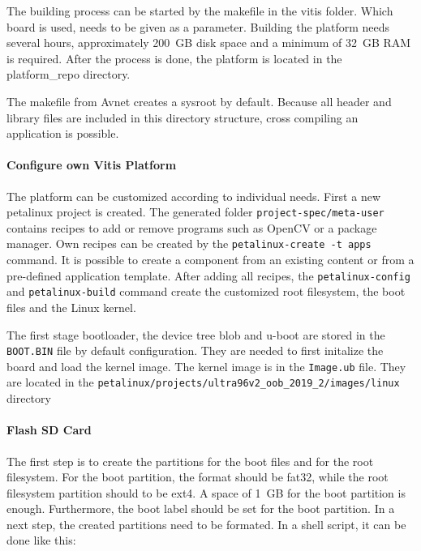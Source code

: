 The building process can be started by the makefile in the vitis folder.
Which board is used, needs to be given as a parameter.
Building the platform needs several hours, approximately \SI{200}{GB} disk space and a minimum of \SI{32}{GB} RAM is required.
After the process is done, the platform is located in the platform\_repo directory.

The makefile from Avnet creates a sysroot by default.
Because all header and library files are included in this directory structure, cross compiling an application is possible.

\paragraph{Configure own Vitis Platform}
The platform can be customized according to individual needs.
First a new petalinux project is created.
The generated folder \texttt{project-spec/meta-user} contains recipes to add or remove programs such as OpenCV or a package manager.
Own recipes can be created by the \texttt{petalinux-create -t apps} command.
It is possible to create a component from an existing content or from a pre-defined application template.
After adding all recipes, the \texttt{petalinux-config} and \texttt{petalinux-build} command create the customized root filesystem, the boot files and the Linux kernel. %

The first stage bootloader, the device tree blob and u-boot are stored in the \texttt{BOOT.BIN} file by default configuration.
They are needed to first initalize the board and load the kernel image. %
The kernel image is in the \texttt{Image.ub} file. %
They are located in the \texttt{petalinux/projects/ultra96v2\_oob\_2019\_2/images/linux} directory

\paragraph{Flash SD Card}
The first step is to create the partitions for the boot files and for the root filesystem.
For the boot partition, the format should be fat32, while the root filesystem partition should to be ext4.
A space of \SI{1}{GB} for the boot partition is enough.
Furthermore, the boot label should be set for the boot partition.
In a next step, the created partitions need to be formated.
In a shell script, it can be done like this:

